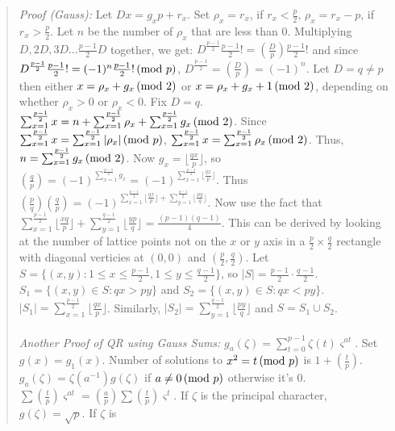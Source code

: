 \begin{quote}
\emph{Proof (Gauss):} 
Let $Dx = g_x p + r_x$.  Set $\rho_x= r_x$, if $r_x < {\frac p 2}$,
$\rho_x= r_x-p$, if $r_x > {\frac p 2}$.  Let $n$ be the number
of $\rho_x$ that are less than $0$.  Multiplying $D, 2D, 3D \ldots
{\frac {p-1} 2} D$ together, we get:
$D^{\frac {p-1} 2} {\frac {p-1} 2}!= ({\frac D p}) {\frac {p-1} 2}!$
and since
$D^{\frac {p-1} 2} {\frac {p-1} 2}!= (-1)^n {\frac {p-1} 2}!\thinspace \textnormal{(mod } p \textnormal{)}$,
$D^{\frac {p-1} 2}= ({\frac D p})= (-1)^n$.  
Let $D=q \ne p$ then either $x= \rho_x + g_x \thinspace \textnormal{(mod } 2 \textnormal{)}$ or
$x= \rho_x + g_x +1 \thinspace \textnormal{(mod } 2 \textnormal{)}$, depending on whether $\rho_x>0$ or $\rho_x<0$.
Fix $D=q$. $\sum_{x=1}^{\frac {p-1} 2} x = n+ \sum_{x=1}^{\frac {p-1} 2} \rho_x +
\sum_{x=1}^{\frac {p-1} 2} g_x \thinspace \textnormal{(mod } 2 \textnormal{)}$.  Since 
$\sum_{x=1}^{\frac {p-1} 2} x =  \sum_{x=1}^{\frac {p-1} 2} |\rho_x| \thinspace \textnormal{(mod } p \textnormal{)}$,
$\sum_{x=1}^{\frac {p-1} 2} x =  \sum_{x=1}^{\frac {p-1} 2} \rho_x \thinspace \textnormal{(mod } 2 \textnormal{)}$.  Thus,
$n= \sum_{x=1}^{\frac {p-1} 2} g_x \thinspace \textnormal{(mod } 2 \textnormal{)}$.
Now $g_x= \lfloor {\frac {qx} p \rfloor}$,
so $({\frac q p})= (-1)^{\sum_{x=1}^{\frac {p-1} 2} g_x}=
(-1)^{\sum_{x=1}^{\frac {p-1} 2} \lfloor {\frac {qx} p} \rfloor}$.  Thus 
$({\frac p q}) ({\frac q p}) = 
(-1)^ {{\sum_{x=1}^{\frac {p-1}2} \lfloor {\frac {qx} p} \rfloor}
+ {\sum_{y=1}^{\frac {q-1} 2} \lfloor {\frac {py} q} \rfloor}}$.  
Now use the fact that
$\sum_{x=1}^{{\frac {p-1} 2}} \lfloor {\frac {xq} {p}} \rfloor +
\sum_{y=1}^{{\frac {q-1} 2}} \lfloor {\frac {yp} {q}} \rfloor =
{\frac {(p-1)(q-1)} 4}$.  This can be derived by looking at the number
of lattice points not on the $x$ or $y$ axis
in a ${\frac p 2} \times {\frac q 2}$ rectangle
with diagonal verticies at $(0, 0)$ and $({\frac p 2}, {\frac q 2})$.  
Let $S= \{ (x, y): 1 \leq x \leq {\frac {p-1} 2}, 1 \leq y \leq {\frac {q-1} 2} \}$,
so $|S|= {\frac {p-1} 2} \cdot {\frac {q-1} 2}$.  
$S_1= \{ (x,y) \in S: qx>py \}$ and
$S_2= \{ (x,y) \in S: qx<py \}$.  
$|S_1|= \sum_{x=1}^{\frac {p-1} 2} \lfloor {\frac {qx} p} \rfloor$.  Similarly,
$|S_2|= \sum_{y=1}^{\frac {q-1} 2} \lfloor {\frac {py} q} \rfloor$ and
$S= S_1 \cup S_2$.
\\
\\
\emph{Another Proof of QR using Gauss Sums:} $g_a (\zeta) = \sum_{t=0}^{p-1} \zeta(t)
\varsigma^{at}$.  Set $g(x)= g_1 (x)$.
Number of solutions to $x^2 = t \thinspace \textnormal{(mod } p \textnormal{)}$ is $1+({\frac t p})$.
$g_a(\zeta)= \zeta(a^{-1}) g(\zeta)$ if $a \ne 0 \thinspace \textnormal{(mod } p \textnormal{)}$ otherwise
it's $0$.
$\sum ({\frac t p}) \varsigma^{at}= ({\frac a p}) \sum ({\frac t p})
\varsigma^{t}$.
If $\zeta$ is the principal character, $g(\zeta)= {\sqrt p}$.  If $\zeta$ is

\end{quote}
